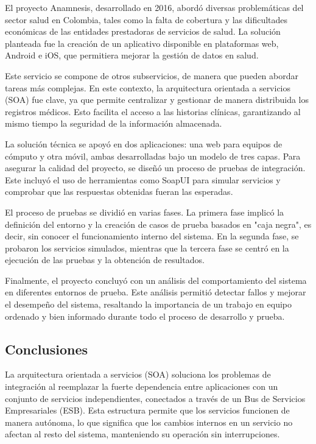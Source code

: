 \documentclass[10pt]{article}
\begin{document}
        El proyecto Anamnesis, desarrollado en 2016, abordó diversas problemáticas del sector salud en Colombia, tales como la falta de cobertura y las dificultades económicas de las entidades prestadoras de servicios de salud. La solución planteada fue la creación de un aplicativo disponible en plataformas web, Android e iOS, que permitiera mejorar la gestión de datos en salud.

        Este servicio se compone de otros subservicios, de manera que pueden abordar tareas más complejas. En este contexto, la arquitectura orientada a servicios (SOA) fue clave, ya que permite centralizar y gestionar de manera distribuida los registros médicos. Esto facilita el acceso a las historias clínicas, garantizando al mismo tiempo la seguridad de la información almacenada.
        
        La solución técnica se apoyó en dos aplicaciones: una web para equipos de cómputo y otra móvil, ambas desarrolladas bajo un modelo de tres capas. Para asegurar la calidad del proyecto, se diseñó un proceso de pruebas de integración. Este incluyó el uso de herramientas como SoapUI para simular servicios y comprobar que las respuestas obtenidas fueran las esperadas.
        
        El proceso de pruebas se dividió en varias fases. La primera fase implicó la definición del entorno y la creación de casos de prueba basados en "caja negra", es decir, sin conocer el funcionamiento interno del sistema. En la segunda fase, se probaron los servicios simulados, mientras que la tercera fase se centró en la ejecución de las pruebas y la obtención de resultados.
        
        Finalmente, el proyecto concluyó con un análisis del comportamiento del sistema en diferentes entornos de prueba. Este análisis permitió detectar fallos y mejorar el desempeño del sistema, resaltando la importancia de un trabajo en equipo ordenado y bien informado durante todo el proceso de desarrollo y prueba.

      \newpage
\begin{center}
    \section{Conclusiones}
\end{center}
        \hspace*{2.5em} La arquitectura orientada a servicios (SOA) soluciona los problemas de integración al reemplazar la fuerte dependencia entre aplicaciones con un conjunto de servicios independientes, conectados a través de un Bus de Servicios Empresariales (ESB). Esta estructura permite que los servicios funcionen de manera autónoma, lo que significa que los cambios internos en un servicio no afectan al resto del sistema, manteniendo su operación sin interrupciones.
\end{document}
